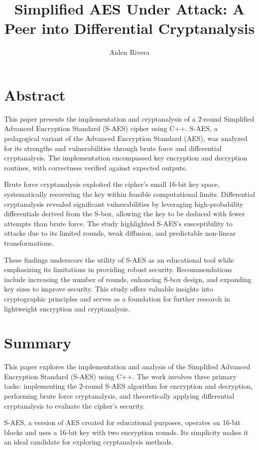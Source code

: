 \documentclass{article}
\author[1]{Aiden Rivera}
\title{Simplified AES Under Attack: A Peer into Differential Cryptanalysis}
\begin{document}
\maketitle
\tableofcontents
\newpage

\section{Abstract}
This paper presents the implementation and cryptanalysis of a 2-round Simplified Advanced Encryption Standard (S-AES) cipher using C++. S-AES, a pedagogical variant of the Advanced Encryption Standard (AES), was analyzed for its strengths and vulnerabilities through brute force and differential cryptanalysis. The implementation encompassed key encryption and decryption routines, with correctness verified against expected outputs.

Brute force cryptanalysis exploited the cipher's small 16-bit key space, systematically recovering the key within feasible computational limits. Differential cryptanalysis revealed significant vulnerabilities by leveraging high-probability differentials derived from the S-box, allowing the key to be deduced with fewer attempts than brute force. The study highlighted S-AES's susceptibility to attacks due to its limited rounds, weak diffusion, and predictable non-linear transformations.

These findings underscore the utility of S-AES as an educational tool while emphasizing its limitations in providing robust security. Recommendations include increasing the number of rounds, enhancing S-box design, and expanding key sizes to improve security. This study offers valuable insights into cryptographic principles and serves as a foundation for further research in lightweight encryption and cryptanalysis.
\newpage


\section{Summary}
This paper explores the implementation and analysis of the Simplified Advanced Encryption Standard (S-AES) using C++. The work involves three primary tasks: implementing the 2-round S-AES algorithm for encryption and decryption, performing brute force cryptanalysis, and theoretically applying differential cryptanalysis to evaluate the cipher's security.

S-AES, a version of AES created for educational purposes, operates on 16-bit blocks and uses a 16-bit key with two encryption rounds. Its simplicity makes it an ideal candidate for exploring cryptanalysis methods.
\end{document}
